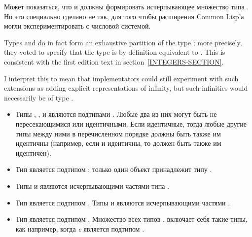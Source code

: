 \beforenoterule
\begin{rationale}
Может показаться, что  и  должны формировать
исчерпывающее множество типа . Но это специально сделано не так, для
того чтобы расширения Common Lisp'а могли экспериментировать с числовой системой.
\end{rationale}
\afternoterule

Types  and 
do in fact form an exhaustive partition of the type ; more precisely,
they voted to specify that the type  is by definition equivalent
to .  This is consistent with the
first edition text in section~\ref{INTEGERS-SECTION}.

I interpret this to mean that implementators could still experiment with
such extensions as adding explicit representations of infinity, but such infinities
would necessarily be of type .

\begin{itemize}
\item
Типы , ,  и 
 являются подтипами .  Любые два из них могут быть не
пересекающимися или идентичными. Если идентичные, тогда любые другие типы между
ними в перечисленном порядке должны быть также им идентичны (например, если  и  идентичны,
то  должен быть также им идентичен).

\item
Тип  является подтипом ; только один объект {\nil}
принадлежит типу .

\item
Типы  и  являются исчерпывающими частями типа .
\end{itemize}

\begin{itemize}
\item
Тип  является подтипом .
Типы  и 
являются исчерпывающими частями .
\end{itemize}

\begin{itemize}
\item
Тип  является подтипом .
Множество всех типов , включает себя такие типы, как
например, когда \emph{c} является подтипом .
\end{itemize}

